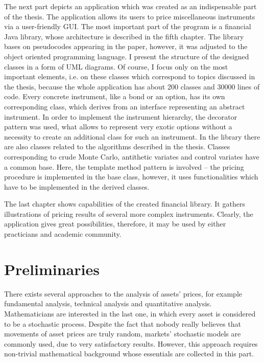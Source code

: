 \documentclass[a4paper,11pt, twoside]{book}
\theoremstyle{definition}
\theoremstyle{remark}
\newcounter{example}[chapter]
\begin{document}
  The next part depicts an application which was created as an indispensable part of the thesis. The application allows its users to price miscellaneous instruments via a user-friendly GUI. The most important part of the program is a financial Java library, whose architecture is described in the fifth chapter. The library bases on pseudocodes appearing in the paper, however, it was adjusted to the object oriented programming language. I present the structure of the designed classes in a form of UML diagrams. Of course, I focus only on the most important elements, i.e. on these classes which correspond to topics discussed in the thesis, because the whole application has about 200 classes and 30000 lines of code. Every concrete instrument, like a bond or an option, has its own corresponding class, which derives from an interface representing an abstract instrument. In order to implement the instrument hierarchy, the decorator pattern was used, what allows to represent very exotic options without a necessity to create an additional class for such an instrument. In the library there are also classes related to the algorithms described in the thesis. Classes corresponding to crude Monte Carlo, antithetic variates and control variates have a common base. Here, the template method pattern is involved -- the pricing procedure is implemented in the base class, however, it uses functionalities which have to be implemented in the derived classes.
  
  The last chapter shows capabilities of the created financial library. It gathers illustrations of pricing results of several more complex instruments. Clearly, the application gives great possibilities, therefore, it may be used by either practicians and academic community.

\chapter{Preliminaries}
\label{chapter:Pre}
There exists several approaches to the analysis of assets' prices, for example fundamental analysis, technical analysis and quantitative analysis. Mathematicians are interested in the last one, in which every asset is considered to be a stochastic process.
Despite the fact that nobody really believes that movements of asset prices are truly random, markets' stochastic models are commonly used, due to very satisfactory results. However, this approach requires non-trivial mathematical background whose essentials are collected in this part.
\end{document}
